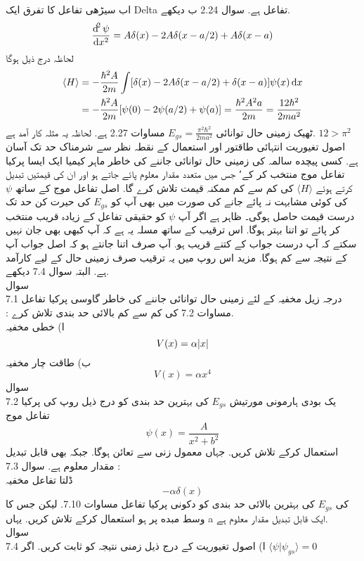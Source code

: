  اب سیڑھی تفاعل کا تفرق ایک Delta تفاعل ہے. سوال 2.24 ب دیکھے.
\[\frac{\dif^{2}{\psi}}{\dif{x^{2}}}=A\delta(x)-2A\delta(x-a/2)+A\delta(x-a)\]
لحاظہ درج ذیل ہوگا 
\begin{align*}
\langle H \rangle &= -\frac{\hbar^{2}A}{2m}\int[\delta(x)-2A\delta(x-a/2)+\delta(x-a)]\psi(x)\dif{x}\\
&= -\frac{\hbar^{2}A}{2m}[\psi(0)-2\psi(a/2)+\psi(a)]=\frac{\hbar^{2}A^{2}a}{2m}=\frac{12\hbar^{2}}{2ma^{2}}\\
\end{align*}
ٹھیک زمینی حال توانائی
\(E_{gs}=\frac{\pi^{2}\hbar^{2}}{2ma^{2}}\)
مساوات 2.27 ہے. لحاظہ یہ مثلہ کار آمد ہے. 
\(12>\pi^{2}\)\\

اصول تغيوریت انتہائی طاقتور اور استعمال کے نقطہ نظر سے شرمناک حد تک آسان ہے. کسی پیچده سالمہ کی زمینی حال توانائی جاننے کی خاطر ماہر کیمیا ایک ایسا پرکیا تفاعل موج منتخب کر کے٬ جس میں متعدد مقدار معلوم پائے جاتے ہو اور ان کی قیمتیں تبديل کرتے ہوئے
\(  \langle H \rangle\)
کی کم سے کم ممکنہ قیمت تلاش کرے گا. اصل تفاعل موج کے ساتھ
\(\psi\) 
کی کوئی مشابہت نہ پائے جانے کی صورت میں بھی آپ کو
\( E_{gs}\)
 کی حیرت کن حد تک درست قیمت حاصل ہوگی۔ ظاہر ہے اگر آپ
\(\psi\) 
 کو حقیقی تفاعل کے زیادہ قریب منتخب کر پائے تو اتنا بہتر ہوگا. اس ترقيب کے ساتھ مسلہ یہ ہے کہ آپ کبھی بھی جان نہیں سکتے کہ آپ درست جواب کے کتنے قريب ہو. آپ صرف اتنا جانتے ہو کہ اصل جواب آپ کے نتیجہ سے كم ہوگا. مزید اس روپ میں یہ ترقيب صرف زمینی حال کے لیے کارآمد ہے.  البتہ سوال 7.4 دیکھے.\\
سوال  \\7.1
درجہ زیل مخفیہ کے لئے زمينی حال توانائی جاننے کی خاطر  گاوسی پرکیا تفاعل\\:
مساوات 7.2 کی كم سے كم بالائی حد بندی تلاش كرے.\\
ا) خطی مخفیہ
\[V(x)=\alpha\abs{x}\]
ب) طاقت چار مخفیہ
\[V(x)=\alpha x^{4}\]
سوال \\7.2
 یک بودی ہارمونی مورتیش 
 \(E_{gs}\)
  کی بہترین حد بندی کو درج ذیل روپ کی پرکیا تفاعل موج
\[\psi(x)=\frac{A}{x^{2}+b^{2}}\]
استعمال کرکے تلاش كریں. جہاں معمول زنی سے تعائن ہوگا. جبکہ بھی قابل تبديل مقدار معلوم ہے.
 سوال 7.3 : \\
 ڈلتا تفاعل مخفیہ
\[-\alpha\delta(x)\]
کی
\(E_{gs}\) 
کی بہترین بالائی حد بندی کو دکونی پرکیا تفاعل مساوات 7.10. لیکن جس کا وسط مبده پر ہو استعمال کرکے تلاش كريں. یہاں a ایک قابل تبديل مقدار معلوم ہے.\\
سوال \\7.4
ا) اصول تغيوريت کے درج ذیل زمنی نتیجہ کو ثابت کریں. اگر
\(\langle \psi | \psi_{gs} \rangle =0\)
